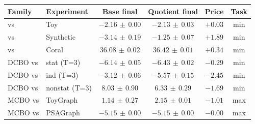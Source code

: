 \begin{tabular}{@{}llcccc@{}}
\toprule
\textbf{Family} & \textbf{Experiment} & \textbf{Base final} & \textbf{Quotient final} & \textbf{Price} & \textbf{Task} \\
\midrule
\CBO{} vs \QCBO{} & Toy & $-2.16{\scriptstyle\,\pm\,}0.00$ & $-2.13{\scriptstyle\,\pm\,}0.03$ & $+0.03$ & min \\
\CBO{} vs \QCBO{} & Synthetic & $-3.14{\scriptstyle\,\pm\,}0.19$ & $-1.25{\scriptstyle\,\pm\,}0.07$ & $+1.89$ & min \\
\CBO{} vs \QCBO{} & Coral & $36.08{\scriptstyle\,\pm\,}0.02$ & $36.42{\scriptstyle\,\pm\,}0.01$ & $+0.34$ & min \\
\midrule
DCBO vs \QDCBO{} & stat (T=3) & $-6.14{\scriptstyle\,\pm\,}0.05$ & $-6.43{\scriptstyle\,\pm\,}0.02$ & $-0.29$ & min \\
DCBO vs \QDCBO{} & ind (T=3) & $-3.12{\scriptstyle\,\pm\,}0.06$ & $-5.57{\scriptstyle\,\pm\,}0.15$ & $-2.45$ & min \\
DCBO vs \QDCBO{} & nonstat (T=3) & $8.03{\scriptstyle\,\pm\,}0.90$ & $6.33{\scriptstyle\,\pm\,}0.29$ & $-1.69$ & min \\
\midrule
MCBO vs \QMCBO{} & ToyGraph & $1.14{\scriptstyle\,\pm\,}0.27$ & $2.15{\scriptstyle\,\pm\,}0.01$ & $-1.01$ & max \\
MCBO vs \QMCBO{} & PSAGraph & $-5.15{\scriptstyle\,\pm\,}0.00$ & $-5.15{\scriptstyle\,\pm\,}0.00$ & $-0.00$ & max \\
\bottomrule
\end{tabular}
